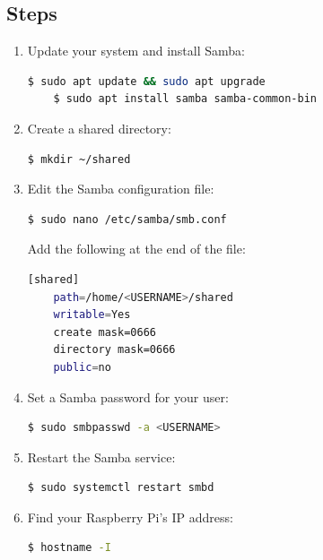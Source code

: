 \documentclass[a4paper,12pt]{article}
\begin{document}
\subsection{Steps}
\begin{enumerate}
    \item Update your system and install Samba:
    \begin{lstlisting}[language=bash, breaklines=true, breakatwhitespace=true, columns=fullflexible]
    $ sudo apt update && sudo apt upgrade
    $ sudo apt install samba samba-common-bin
    \end{lstlisting}

    \item Create a shared directory:
    \begin{lstlisting}[language=bash, breaklines=true, breakatwhitespace=true, columns=fullflexible]
    $ mkdir ~/shared
    \end{lstlisting}

    \item Edit the Samba configuration file:
    \begin{lstlisting}[language=bash, breaklines=true, breakatwhitespace=true, columns=fullflexible]
    $ sudo nano /etc/samba/smb.conf
    \end{lstlisting}
    Add the following at the end of the file:
    \begin{lstlisting}[language=bash, breaklines=true, breakatwhitespace=true, columns=fullflexible]
    [shared]
    path=/home/<USERNAME>/shared
    writable=Yes
    create mask=0666
    directory mask=0666
    public=no
    \end{lstlisting}

    \item Set a Samba password for your user:
    \begin{lstlisting}[language=bash, breaklines=true, breakatwhitespace=true, columns=fullflexible]
    $ sudo smbpasswd -a <USERNAME>
    \end{lstlisting}

    \item Restart the Samba service:
    \begin{lstlisting}[language=bash, breaklines=true, breakatwhitespace=true, columns=fullflexible]
    $ sudo systemctl restart smbd
    \end{lstlisting}

    \item Find your Raspberry Pi's IP address:
    \begin{lstlisting}[language=bash, breaklines=true, breakatwhitespace=true, columns=fullflexible]
    $ hostname -I
    \end{lstlisting}


\end{enumerate}
\end{document}
